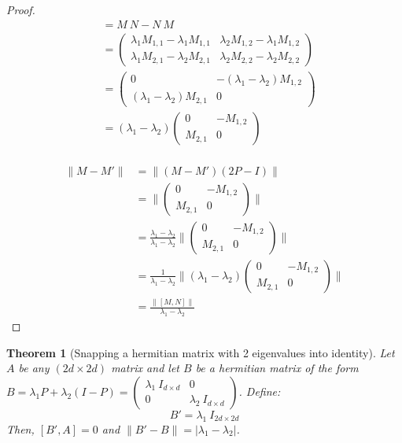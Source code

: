 \documentclass[12pt]{article}
\theoremstyle{plain}
\newtheorem{theorem}{Theorem}[section]
\begin{document}
\begin{proof}
\begin{align*}
[M, N] &= M\ N - N\ M\\
&= \begin{pmatrix} \lambda_1 M_{1,1} - \lambda_1 M_{1,1} & \lambda_2 M_{1,2} - \lambda_1 M_{1,2} \\ \lambda_1 M_{2,1} - \lambda_2 M_{2,1} & \lambda_2 M_{2,2} - \lambda_2 M_{2,2}
\end{pmatrix}\\
&= \begin{pmatrix} 0 & - \left(\lambda_1 - \lambda_2\right) M_{1,2} \\ \left(\lambda_1 - \lambda_2\right) M_{2,1} & 0
\end{pmatrix}\\
&= \left(\lambda_1 - \lambda_2\right)\begin{pmatrix} 0 & - M_{1,2} \\  M_{2,1} & 0
\end{pmatrix}\\
\end{align*}

\begin{align*}
\|M - M' \| &= \| (M - M')(2P - I)\|\\
&= \|\begin{pmatrix}
            0 & -M_{1,2}\\
            M_{2,1} & 0
        \end{pmatrix} \|\\
&= \frac{\lambda_1 - \lambda_2}{\lambda_1 - \lambda_2}\|\begin{pmatrix}
            0 & -M_{1,2}\\
            M_{2,1} & 0
        \end{pmatrix} \|\\  
&= \frac{1}{\lambda_1 - \lambda_2}\|(\lambda_1 - \lambda_2)\begin{pmatrix}
            0 & -M_{1,2}\\
            M_{2,1} & 0
        \end{pmatrix} \|\\
&= \frac{\|[M, N]\|}{\lambda_1 - \lambda_2}
\end{align*}

\end{proof}


\begin{theorem}[Snapping a hermitian matrix with 2 eigenvalues into identity]
Let $A$ be any $(2d \times 2d)$ matrix and let $B$ be a hermitian matrix of the form $B = \lambda_1 P + \lambda_2 (I - P) = \begin{pmatrix}
        \lambda_1\: I_{d \times d} & 0\\ 0 & \lambda_2\: I_{d \times d}
    \end{pmatrix}$. Define:
    \begin{equation}
    B' = \lambda_1\: I_{2d \times 2d}
    \end{equation}
Then, $[B', A] = 0$ and $\|B' - B \| = |\lambda_1 - \lambda_2|$.
\end{theorem}
\end{document}
